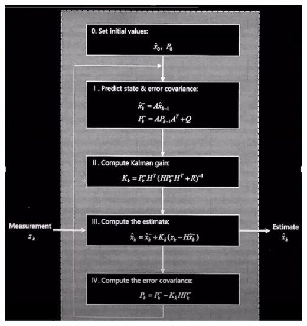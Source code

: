 \begin{minipage}{0.45\textwidth}
\centering
\includegraphics[width=1\textwidth]{resources/chapter-4/kalman-fillter-2.png}
\end{minipage}
\\ \\


